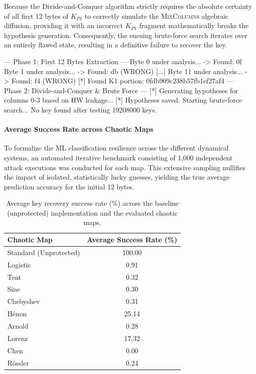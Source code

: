\documentclass[11pt,a4paper]{report}
\begin{document}
Because the Divide-and-Conquer algorithm strictly requires the absolute certainty of all first 12 bytes of $K_{P1}$ to correctly simulate the \textsc{MixColumns} algebraic diffusion, 
providing it with an incorrect $K_{P1}$ fragment mathematically breaks the hypothesis generation. 
Consequently, the ensuing brute-force search iterates over an entirely flawed state, resulting in a definitive failure to recover the key.

\begin{lightterminal}
--- Phase 1: First 12 Bytes Extraction ---
Byte 0 under analysis...  -> Found: 0f
Byte 1 under analysis...  -> Found: db (WRONG)
[...]
Byte 11 under analysis... -> Found: f4 (WRONG)
[*] Found K1 portion: 0fdb909c238b57fb1ef27af4
--- Phase 2: Divide-and-Conquer & Brute Force ---
[*] Generating hypotheses for columns 0-3 based on HW leakage...
[*] Hypotheses saved. Starting brute-force search...
No key found after testing 19208000 keys.
\end{lightterminal}

\paragraph{Average Success Rate across Chaotic Maps}
To formalize the ML classification resilience across the different dynamical systems, an automated iterative benchmark consisting of 1,000 independent attack executions was conducted for each map. 
This extensive sampling nullifies the impact of isolated, statistically lucky guesses, yielding the true average prediction accuracy for the initial 12 bytes.

\begin{table}[htbp]
    \centering
    \begin{tabular}{lc}
        \toprule
        \textbf{Chaotic Map} & \textbf{Average Success Rate (\%)} \\
        \midrule
        Standard (Unprotected) & 100.00 \\
        \midrule
        Logistic               &   0.91 \\
        Tent                   &   0.32 \\
        Sine                   &   0.30 \\
        Chebyshev              &   0.31 \\
        H\'enon                  &  25.14 \\
        Arnold                 &   0.28 \\
        Lorenz                 &  17.32 \\
        Chen                   &   0.00 \\
        R\"ossler                &   0.24 \\
        \bottomrule
    \end{tabular}
    \caption{Average key recovery success rate (\%) across the baseline (unprotected) implementation and the evaluated chaotic maps.}
    \label{tab:success_rates}
\end{table}
\end{document}
